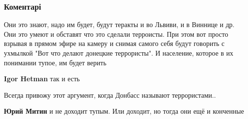  
 
 
 
 
\subsubsection{Коментарі}
\label{sec:27_08_2021.fb.skubchenko_aleksandr.1.afganistan_terror.cmt}

\begin{itemize}
 

Они это знают, надо им будет, будут теракты и во Львиви, и в Виннице и др. Они
это умеют и обставят что это сделали терроисты. При этом вот просто взрывая в
прямом эфире на камеру и снимая самого себя будут говорить с ухмылкой "Вот что
делают донецкие террористы". И население, которое в их понимании тупое, им
будет верить

\begin{itemize}
 
\textbf{Igor Hetman} так и есть
\end{itemize}

 
Всегда привожу этот аргумент, когда Донбасс называют террористами..

\begin{itemize}
 
\textbf{Юрий Митин} и не доходит тупым. Или доходит, но тогда они ещё и конченные


\end{itemize}
\end{itemize}
